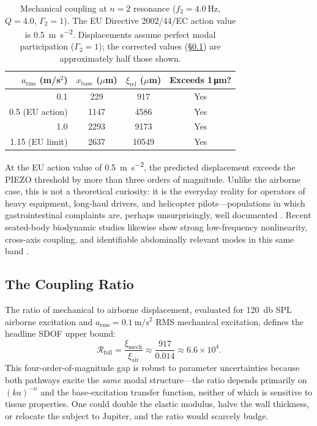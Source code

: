 \begin{table}[htbp]
  \centering
  \caption{Mechanical coupling at $n=2$ resonance
  ($f_2 = \SI{4.0}{\hertz}$, $Q = 4.0$, $\Gamma_2 = 1$).  The EU Directive 2002/44/EC
  action value is \SI{0.5}{\metre\per\second\squared}.  Displacements assume
  perfect modal participation ($\Gamma_2 = 1$); the corrected values
  (\S\ref{sec:coupling_ratio}) are approximately half those shown.}
  \label{tab:mechanical}
  \begin{tabular}{rccc}
    \toprule
    $a_\mathrm{rms}$ (m/s$^2$) & $x_\mathrm{base}$ ($\mu$m) &
    $\xi_\mathrm{rel}$ ($\mu$m) & Exceeds 1\,\si{\micro\metre}? \\
    \midrule
    0.1 & 229  & 917  & Yes \\
    0.5 (EU action) & 1147  & 4586 & Yes \\
    1.0 & 2293 & 9173 & Yes \\
    1.15 (EU limit) & 2637 & 10549 & Yes \\
    \bottomrule
  \end{tabular}
\end{table}

At the EU action value of \SI{0.5}{\metre\per\second\squared}, the predicted
displacement exceeds the PIEZO threshold by more than three orders of
magnitude.  Unlike the airborne case, this is not a theoretical curiosity:
it is the everyday reality for operators of heavy equipment, long-haul
drivers, and helicopter pilots---populations in which gastrointestinal
complaints are, perhaps unsurprisingly, well documented
\cite{Griffin1990}.  Recent seated-body biodynamic studies likewise
show strong low-frequency nonlinearity, cross-axis coupling, and identifiable
abdominally relevant modes in this same band \cite{Zheng2012,Gao2021}.

\subsection{The Coupling Ratio}
\label{sec:coupling_ratio}

The ratio of mechanical to airborne displacement, evaluated for
\SI{120}{\decibel} SPL airborne excitation and
$a_\mathrm{rms} = \SI{0.1}{\metre\per\second\squared}$ RMS mechanical
excitation, defines the headline SDOF upper bound:
\begin{equation}
  \mathcal{R}_\mathrm{full} = \frac{\xi_\mathrm{mech}}{\xi_\mathrm{air}}
  \approx \frac{917}{0.014} \approx 6.6 \times 10^4.
  \label{eq:coupling_ratio}
\end{equation}
This four-order-of-magnitude gap is robust to parameter uncertainties because
both pathways excite the \emph{same} modal structure---the ratio depends
primarily on $(ka)^{-n}$ and the base-excitation transfer function, neither of
which is sensitive to tissue properties.  One could double the elastic modulus,
halve the wall thickness, or relocate the subject to Jupiter, and the ratio
would scarcely budge.

